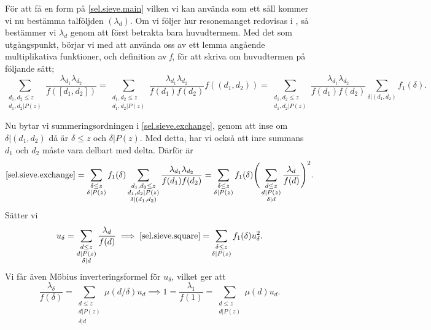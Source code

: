 För att få en form på \eqref{sel.sieve.main} vilken vi kan använda som ett såll kommer vi nu bestämma talföljden \((\lambda_d)\). 
Om vi följer hur resonemanget redovisas i \cite{cojocarumurty}, så bestämmer vi \(\lambda_d\) genom att först betrakta bara huvudtermem. 
 Med det som utgångspunkt, börjar vi med att använda oss av ett lemma angående multiplikativa funktioner, och definition av \textit{f}, för att skriva om huvudtermen på följande sätt;
\begin{equation}
    \sum_{\substack{d_1,d_2\leq z\\d_1,d_2|P(z)}}\frac{\lambda_{d_1}\lambda_{d_2}}{f([d_1,d_2])} = \sum_{\substack{d_1,d_2\leq z\\d_1,d_2|P(z)}}\frac{\lambda_{d_1}\lambda_{d_2}}{f(d_1)f(d_2)}f((d_1,d_2)) = \sum_{\substack{d_1,d_2\leq z\\d_1,d_2|P(z)}}\frac{\lambda_{d_1}\lambda_{d_2}}{f(d_1)f(d_2)}\sum_{\delta|(d_1,d_2)}f_1(\delta).\label{sel.sieve.exchange}
\end{equation}

Nu bytar vi summeringsordningen i \eqref{sel.sieve.exchange}, genom att inse om \(\delta|(d_1,d_2)\) då är \(\delta \leq z\) och \(\delta | P(z)\).
Med detta, har vi också att inre summans \(d_1\) och \(d_2\) måste vara delbart med delta. Därför är
\begin{equation}
    \eqref{sel.sieve.exchange} = \sum_{\substack{\delta \leq z\\ \delta | P(z)}}f_1(\delta) \sum_{\substack{d_1,d_2\leq z\\d_1,d_2|P(z)\\\delta|(d_1,d_2)}}\frac{\lambda_{d_1}\lambda_{d_2}}{f(d_1)f(d_2)} = \sum_{\substack{\delta \leq z\\ \delta | P(z)}}f_1(\delta)\Bigg(\sum_{\substack{d\leq z\\d|P(z)\\\delta|d}}\frac{\lambda_d}{f(d)}\Bigg)^2.\label{sel.sieve.square}
\end{equation}
Sätter vi 
\begin{equation}
u_\delta = \sum_{\substack{d\leq z \\ d|P(z) \\ \delta | d}} \frac{\lambda_d}{f(d)} \implies \eqref{sel.sieve.square} = \sum_{\substack{\delta \leq z\\ \delta | P(z)}}f_1(\delta) u_\delta^2\label{sel.sieve.uuu}.
\end{equation}
Vi får även Möbius inverteringsformel för \(u_\delta\), vilket ger att
\begin{equation}
    \frac{\lambda_\delta}{f(\delta)} = \sum_{\substack{d\leq z\\d|P(z)\\\delta|d}} \mu(d/\delta)u_d \implies 1 = \frac{\lambda_1}{f(1)} = \sum_{\substack{d\leq z\\ d|P(z)}}\mu(d)u_d.\label{sel.sieve.one}
\end{equation}

